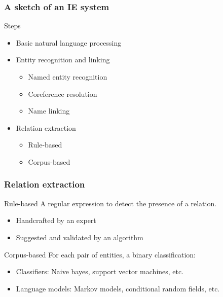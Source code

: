 \documentclass{beamer}
\begin{document}
\begin{frame}
\frametitle{A sketch of an IE system}

\begin{block}{Steps}
\begin{itemize}
    \item Basic natural language processing
    \item Entity recognition and linking
    \begin{itemize}
        \item<2-> Named entity recognition
        \item<2-> Coreference resolution
        \item<2-> Name linking
    \end{itemize}
    \item Relation extraction
    \begin{itemize}
        \item<3-> Rule-based
        \item<3-> Corpus-based
    \end{itemize}
\end{itemize}
\end{block}

\end{frame}


\begin{frame}
\frametitle{Relation extraction}

\begin{block}{Rule-based}
A regular expression to detect the presence of a relation.
\begin{itemize}
    \item Handcrafted by an expert
    \item Suggested and validated by an algorithm
\end{itemize}
\end{block}

\begin{block}{Corpus-based}
For each pair of entities, a binary classification:
\begin{itemize}
    \item Classifiers: Naive bayes, support vector machines, etc.
    \item Language models: Markov models, conditional random fields, etc.
\end{itemize}
\end{block}

\end{frame}

\end{document}
